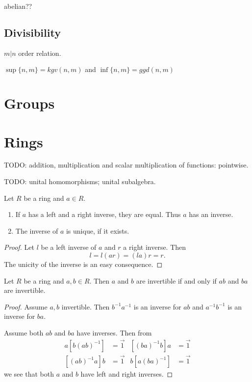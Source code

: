 abelian??

\section{Divisibility}
$m|n$ order relation.

$\sup\{n,m\} = kgv(n,m)$ and $\inf\{n,m\} = ggd(n,m)$







\chapter{Groups}



\chapter{Rings}
TODO: addition, multiplication and scalar multiplication of functions: pointwise.

TODO: unital homomorphisms; unital subalgebra.

\begin{lemma}
Let $R$ be a ring and $a\in R$.
\begin{enumerate}
\item If $a$ has a left and a right inverse, they are equal. Thus $a$ has an inverse.
\item The inverse of $a$ is unique, if it exists.
\end{enumerate}
\end{lemma}
\begin{proof}
Let $l$ be a left inverse of $a$ and $r$ a right inverse. Then
\[ l = l(ar) = (la)r = r. \]
The unicity of the inverse is an easy consequence.
\end{proof}

\begin{lemma} \label{lemma:productInvertibility}
Let $R$ be a ring and $a,b\in R$. Then $a$ and $b$ are invertible \textup{if and only if} $ab$ and $ba$ are invertible.
\end{lemma}
\begin{proof}
Assume $a,b$ invertible. Then $b^{-1}a^{-1}$ is an inverse for $ab$ and $a^{-1}b^{-1}$ is an inverse for $ba$.

Assume both $ab$ and $ba$ have inverses. Then from
\begin{align*}
a[b(ab)^{-1}] &= \vec{1} & [(ba)^{-1}b]a &= \vec{1} \\
[(ab)^{-1}a]b &= \vec{1} & b[a(ba)^{-1}] &= \vec{1}
\end{align*} 
we see that both $a$ and $b$ have left and right inverses.
\end{proof}

